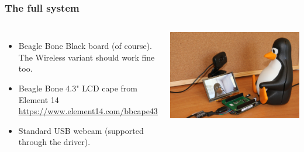 \begin{frame}
  \frametitle{The full system}
  \begin{columns}
    \begin{itemize}
	\item Beagle Bone Black board (of course). The Wireless variant
	      should work fine too.
	\item Beagle Bone 4.3" LCD cape from Element 14\\
              \url{https://www.element14.com/bbcape43}
        \item Standard USB webcam (supported through the 
	      driver).
    \end{itemize}
     \includegraphics[width=\textwidth]{common/beaglecam.jpg}
  \end{columns}
\end{frame}
